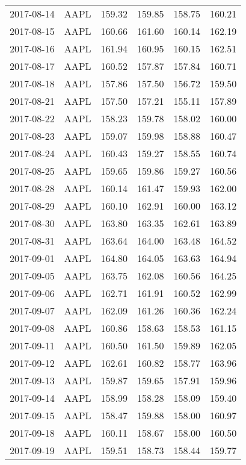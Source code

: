\documentclass[12pt,a4paper]{report}
\begin{document}
\begin{appendices}
\begin{longtable}{llllll}
  2017-08-14 & AAPL & 159.32 & 159.85 & 158.75 & 160.21 \\ 
  2017-08-15 & AAPL & 160.66 & 161.60 & 160.14 & 162.19 \\ 
  2017-08-16 & AAPL & 161.94 & 160.95 & 160.15 & 162.51 \\ 
  2017-08-17 & AAPL & 160.52 & 157.87 & 157.84 & 160.71 \\ 
  2017-08-18 & AAPL & 157.86 & 157.50 & 156.72 & 159.50 \\ 
  2017-08-21 & AAPL & 157.50 & 157.21 & 155.11 & 157.89 \\ 
  2017-08-22 & AAPL & 158.23 & 159.78 & 158.02 & 160.00 \\ 
  2017-08-23 & AAPL & 159.07 & 159.98 & 158.88 & 160.47 \\ 
  2017-08-24 & AAPL & 160.43 & 159.27 & 158.55 & 160.74 \\ 
  2017-08-25 & AAPL & 159.65 & 159.86 & 159.27 & 160.56 \\ 
  2017-08-28 & AAPL & 160.14 & 161.47 & 159.93 & 162.00 \\ 
  2017-08-29 & AAPL & 160.10 & 162.91 & 160.00 & 163.12 \\ 
  2017-08-30 & AAPL & 163.80 & 163.35 & 162.61 & 163.89 \\ 
  2017-08-31 & AAPL & 163.64 & 164.00 & 163.48 & 164.52 \\ 
  2017-09-01 & AAPL & 164.80 & 164.05 & 163.63 & 164.94 \\ 
  2017-09-05 & AAPL & 163.75 & 162.08 & 160.56 & 164.25 \\ 
  2017-09-06 & AAPL & 162.71 & 161.91 & 160.52 & 162.99 \\ 
  2017-09-07 & AAPL & 162.09 & 161.26 & 160.36 & 162.24 \\ 
  2017-09-08 & AAPL & 160.86 & 158.63 & 158.53 & 161.15 \\ 
  2017-09-11 & AAPL & 160.50 & 161.50 & 159.89 & 162.05 \\ 
  2017-09-12 & AAPL & 162.61 & 160.82 & 158.77 & 163.96 \\ 
  2017-09-13 & AAPL & 159.87 & 159.65 & 157.91 & 159.96 \\ 
  2017-09-14 & AAPL & 158.99 & 158.28 & 158.09 & 159.40 \\ 
  2017-09-15 & AAPL & 158.47 & 159.88 & 158.00 & 160.97 \\ 
  2017-09-18 & AAPL & 160.11 & 158.67 & 158.00 & 160.50 \\ 
  2017-09-19 & AAPL & 159.51 & 158.73 & 158.44 & 159.77 \\ 

\end{longtable}
\end{appendices}
\end{document}
